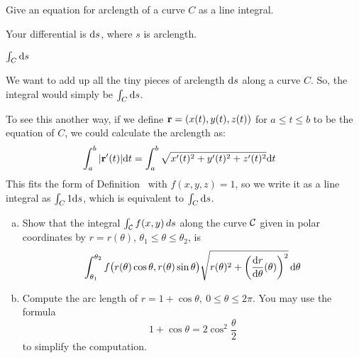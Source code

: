 

\subsection*{\Conceptual}
\begin{question}
Give an equation for arclength of a curve $C$ as a line integral.
\end{question}
\begin{hint}
Your differential is $\mathrm{d}s$, where $s$ is arclength.
\end{hint}
\begin{answer}
$\int_C \mathrm{d}s$
\end{answer}
\begin{solution}
We want to add up all the tiny pieces of arclength $\mathrm{d}s$ along a curve $C$. So, the integral would simply be $\int_C \mathrm{d}s$.

To see this another way, if we define $\mathbf{r}=(x(t),y(t),z(t))$ for $a \le t \le b$ to be the equation of $C$, we could calculate the arclength as:
\begin{align*}
\int_a^b |\mathbf{r}'(t)|\mathrm{d}t&=\int_a^b \sqrt{x'(t)^2+y'(t)^2+z'(t)^2}\mathrm{d}t
\end{align*}
This fits the form of Definition~ with $f(x,y,z)=1$, so we write it as a line integral as $\int_C 1 \mathrm{d}s$, which is equivalent to $\int_C \mathrm{d}s$.
\end{solution}


\begin{question}
\begin{enumerate}[(a)]
\item
Show that the integral $\int_{\mathcal{C}} f(x,y)\,ds$ 
along the curve $\mathcal{C}$ given in polar coordinates by 
$r=r(\theta)$, $\theta_1\le \theta\le\theta_2$, is
\begin{equation*}
\int_{\theta_1}^{\theta_2}f\big(r(\theta)\cos\theta, r(\theta)\sin\theta\big) \sqrt{r(\theta)^2+\left(\diff{r}{\theta}(\theta)\right)^2}\,
\dee{\theta}
\end{equation*}

\item
Compute the arc length of $r=1+\cos\theta,\ 0\le \theta\le 2\pi$.
You may use the formula
\begin{equation*}
1+\cos\theta=2\cos^2\frac{\theta}{2}
\end{equation*}
to simplify the computation.	
\end{enumerate}
\end{question}

